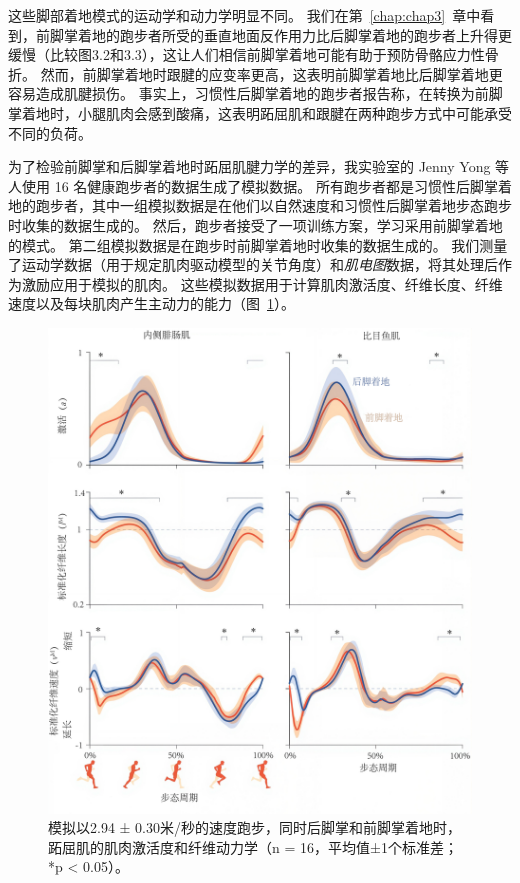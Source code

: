 这些脚部着地模式的运动学和动力学明显不同。
我们在第~\ref{chap:chap3}~章中看到，前脚掌着地的跑步者所受的垂直地面反作用力比后脚掌着地的跑步者上升得更缓慢（比较图3.2和3.3），这让人们相信前脚掌着地可能有助于预防骨骼应力性骨折。
然而，前脚掌着地时跟腱的应变率更高\cite{lyght2016effects}，这表明前脚掌着地比后脚掌着地更容易造成肌腱损伤。
事实上，习惯性后脚掌着地的跑步者报告称，在转换为前脚掌着地时，小腿肌肉会感到酸痛，这表明跖屈肌和跟腱在两种跑步方式中可能承受不同的负荷。


为了检验前脚掌和后脚掌着地时跖屈肌腱力学的差异，我实验室的 Jenny Yong 等人使用 16 名健康跑步者的数据生成了模拟数据。
所有跑步者都是习惯性后脚掌着地的跑步者，其中一组模拟数据是在他们以自然速度和习惯性后脚掌着地步态跑步时收集的数据生成的。
然后，跑步者接受了一项训练方案，学习采用前脚掌着地的模式。
第二组模拟数据是在跑步时前脚掌着地时收集的数据生成的。
我们测量了运动学数据（用于规定肌肉驱动模型的关节角度）和\textit{肌电图}数据，将其处理后作为激励应用于模拟的肌肉。
这些模拟数据用于计算肌肉激活度、纤维长度、纤维速度以及每块肌肉产生主动力的能力（图~\ref{fig:12_10}）。

\begin{figure}[!htb]
	\centering
	\includegraphics[width=1.0\linewidth]{chap12/12_10}
	\caption{模拟以2.94 ± 0.30米/秒的速度跑步，同时后脚掌和前脚掌着地时，跖屈肌的肌肉激活度和纤维动力学（n = 16，平均值±1个标准差；*p < 0.05）\cite{yong2020foot}。 \label{fig:12_10}}
\end{figure}



